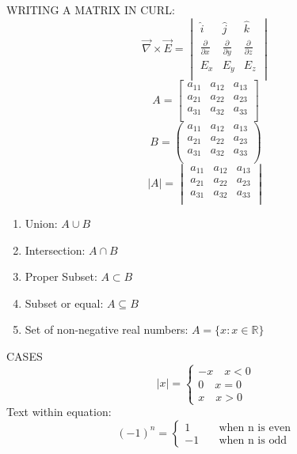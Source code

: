 WRITING A MATRIX IN CURL:
\begin{equation}
\vec{\nabla}\times\vec{E}=
\begin{vmatrix}  
    \hat{i} & \hat{j} & \hat{k}\\
    \frac{\partial}{\partial x} & \frac{\partial}{\partial y} & \frac{\partial}{\partial z}\\
    E_x & E_y & E_z\\
\end{vmatrix}
\end{equation}
\begin{equation}
A=
\begin{bmatrix}  
    a_{11} & a_{12} & a_{13}\\
    a_{21} & a_{22} & a_{23}\\
    a_{31} & a_{32} & a_{33}\\
\end{bmatrix}
\end{equation}
\begin{equation}
B=
\begin{pmatrix}  
    a_{11} & a_{12} & a_{13}\\
    a_{21} & a_{22} & a_{23}\\
    a_{31} & a_{32} & a_{33}\\
\end{pmatrix}
\end{equation}
\begin{equation}
|A|=
\begin{vmatrix}  
    a_{11} & a_{12} & a_{13}\\
    a_{21} & a_{22} & a_{23}\\
    a_{31} & a_{32} & a_{33}\\
\end{vmatrix}
\end{equation}

\begin{enumerate}
    \item Union: $A\cup B$
    \item Intersection: $A \cap B$
    \item Proper Subset: $A \subset B$
    \item Subset or equal: $A \subseteq B$
    \item Set of non-negative real numbers: $A=\{x:x \in \mathbb{R}\}$
\end{enumerate}

CASES
\begin{equation}
    |x|=
    \begin{cases}
        -x \quad x<0\\
        0 \quad x=0\\
        x\quad x>0
    \end{cases}
\end{equation}
Text within equation:
\begin{equation*}
    (-1)^n=
    \begin{cases}
        1 \quad&\text{when n is even}\\
        -1 \quad&\text{when n is odd}
    \end{cases}
\end{equation*}
